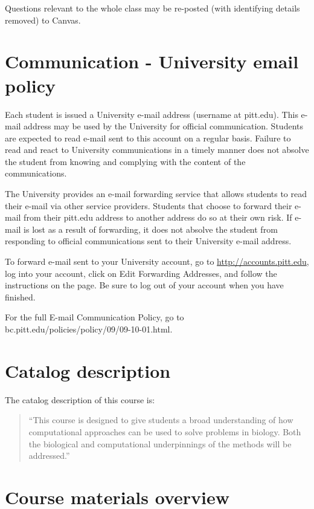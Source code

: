 \documentclass[
]{book}
\begin{document}
Questions relevant to the whole class may be re-posted (with identifying details removed) to Canvas.

\hypertarget{communication---university-email-policy}{%
\chapter{Communication - University email policy}\label{communication---university-email-policy}}

Each student is issued a University e-mail address (username at pitt.edu). This e-mail address may be used by the University for official communication. Students are expected to read e-mail sent to this account on a regular basis. Failure to read and react to University communications in a timely manner does not absolve the student from knowing and complying with the content of the communications.

The University provides an e-mail forwarding service that allows students to read their e-mail via other service providers. Students that choose to forward their e-mail from their pitt.edu address to another address do so at their own risk. If e-mail is lost as a result of forwarding, it does not absolve the student from responding to official communications sent to their University e-mail address.

To forward e-mail sent to your University account, go to \url{http://accounts.pitt.edu}, log into your account, click on Edit Forwarding Addresses, and follow the instructions on the page. Be sure to log out of your account when you have finished.

For the full E-mail Communication Policy, go to bc.pitt.edu/policies/policy/09/09-10-01.html.

\hypertarget{catalog-description}{%
\chapter{Catalog description}\label{catalog-description}}

The catalog description of this course is:

\begin{quote}
``This course is designed to give students a broad understanding of how computational approaches can be used to solve problems in biology. Both the biological and computational underpinnings of the methods will be addressed.''
\end{quote}

\hypertarget{course-materials-overview}{%
\chapter{Course materials overview}\label{course-materials-overview}}
\end{document}
